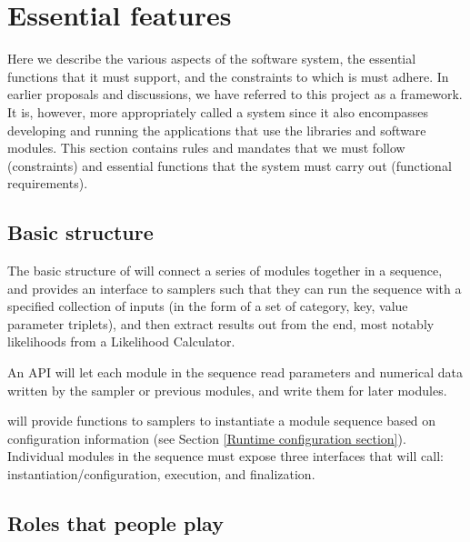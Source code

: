 \documentclass{memarticle}
\newcommand{\cosmosis}{\name{CosmoSIS}\xspace}
\begin{document}
\chapter{Essential features}

Here we describe the various aspects of the software system, the
essential functions that it must support, and the constraints to which
is must adhere. In earlier proposals and discussions, we have referred
to this project as a framework. It is, however, more appropriately
called a system since it also encompasses developing and running the
applications that use the libraries and software modules. This section
contains rules and mandates that we must follow (constraints) and
essential functions that the system must carry out (functional
requirements).

\section{Basic structure}

The basic structure of \cosmosis will connect a series of modules
together in a sequence, and provides an interface to samplers such that
they can run the sequence with a specified collection of inputs (in the
form of a set of category, key, value parameter triplets), and then extract results
out from the end, most notably likelihoods from a Likelihood Calculator.

An API will let each module in the sequence read parameters and numerical
data written by the sampler or previous modules, and write them for later
modules.

\cosmosis will provide functions to samplers to instantiate a module sequence based on configuration
information (see Section \ref{Runtime configuration section}).  Individual modules
in the sequence
must expose three interfaces that \cosmosis will call: instantiation/configuration,
execution, and finalization.

\section{Roles that people play}
\end{document}
